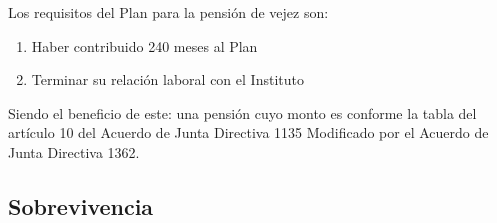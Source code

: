 \documentclass[12pt,letterpaper,titlepage]{article}
\begin{document}
Los requisitos del Plan para la pensión de vejez son:
\begin{enumerate}
	\item Haber contribuido 240 meses al Plan
	\item Terminar su relación laboral con el Instituto
\end{enumerate}

Siendo el beneficio de este: una pensión cuyo monto es conforme la tabla del artículo 10 del Acuerdo de Junta Directiva 1135 Modificado por el Acuerdo de Junta Directiva 1362.

\subsection{Sobrevivencia}




























	
\end{document}
